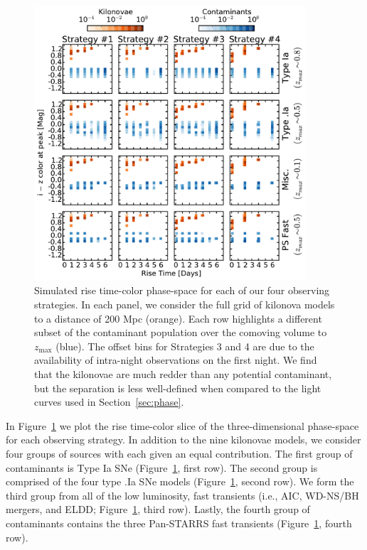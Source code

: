 \begin{figure}[t!]
\centering
\includegraphics[width=0.9\textwidth]{./figs/chapter2/ch2_f8.pdf}
\caption{Simulated rise time-color phase-space for each of our four observing strategies. In each panel, we consider the full grid of kilonova models to a distance of 200 Mpc (orange). Each row highlights a different subset of the contaminant population over the comoving volume to $z_{\text{max}}$ (blue). The offset bins for Strategies 3 and 4 are due to the availability of intra-night observations on the first night. We find that the kilonovae are much redder than any potential contaminant, but the separation is less well-defined when compared to the light curves used in Section~\ref{sec:phase}.}
\label{fig:mcphasecol}
\end{figure}
   
In Figure~\ref{fig:mcphasecol} we plot the rise time-color slice of the three-dimensional phase-space for each observing strategy. In addition to the nine kilonovae models, we consider four groups of sources with each given an equal contribution. The first group of contaminants is Type Ia SNe (Figure~\ref{fig:mcphasecol}, first row). The second group is comprised of the four type .Ia SNe models (Figure~\ref{fig:mcphasecol}, second row). We form the third group from all of the low luminosity, fast transients (i.e., AIC, WD-NS/BH mergers, and ELDD; Figure~\ref{fig:mcphasecol}, third row). Lastly, the fourth group of contaminants contains the three Pan-STARRS fast transients (Figure~\ref{fig:mcphasecol}, fourth row).
   
